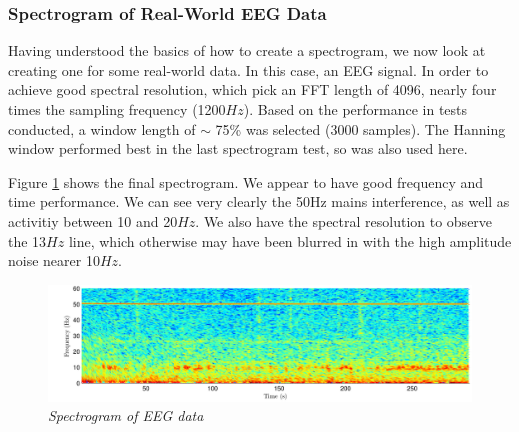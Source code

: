 \documentclass[./main.tex]{subfiles}
\begin{document}
\subsubsection{Spectrogram of Real-World EEG Data}

Having understood the basics of how to create a spectrogram, we now look at creating one for some real-world data. In this case, an EEG signal. In order to achieve good spectral resolution, which pick an FFT length of 4096, nearly four times the sampling frequency (1200$Hz$). Based on the performance in tests conducted, a window length of $\sim$ 75\% was selected (3000 samples). The Hanning window performed best in the last spectrogram test, so was also used here.

Figure \ref{fig:2_3_b} shows the final spectrogram. We appear to have good frequency and time performance. We can see very clearly the 50Hz mains interference, as well as activitiy between 10 and 20$Hz$. We also have the spectral resolution to observe the 13$Hz$ line, which otherwise may have been blurred in with the high amplitude noise nearer 10$Hz$.

\begin{figure}[h]
	\centering 
	\includegraphics[scale=0.8]{fig/2/2_3_b.pdf}
	\caption{\textit{Spectrogram of EEG data}}
	\label{fig:2_3_b}
\end{figure}
\end{document}
